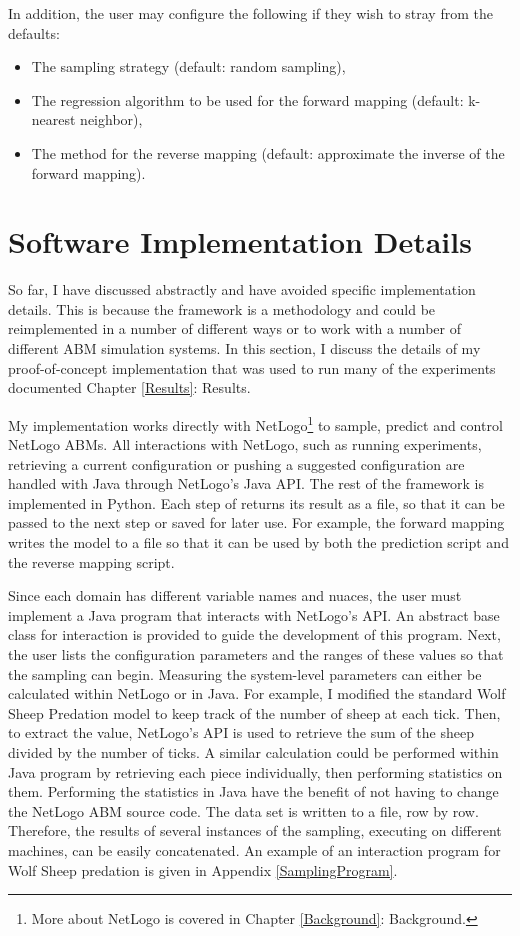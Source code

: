 In addition, the user may configure the following if they wish to stray from the defaults:
\begin{itemize}
   \item The sampling strategy (default: random sampling),
   \item The regression algorithm to be used for the forward mapping (default: k-nearest neighbor),
   \item The method for the reverse mapping (default: approximate the inverse of the forward mapping).
\end{itemize}


\section{Software Implementation Details}
So far, I have discussed \fw abstractly and have avoided specific implementation details.
This is because the framework is a methodology and could be reimplemented in a number of different ways or to work with a number of different ABM simulation systems.
In this section, I discuss the details of my proof-of-concept implementation that was used to run many of the experiments documented Chapter \ref{Results}: Results.

My implementation works directly with NetLogo\footnote{More about NetLogo is covered in Chapter \ref{Background}: Background.} to sample, predict and control NetLogo ABMs.
All interactions with NetLogo, such as running experiments, retrieving a current configuration or pushing a suggested configuration are handled with Java through NetLogo's Java API.
The rest of the framework is implemented in Python.
Each step of \fw returns its result as a file, so that it can be passed to the next step or saved for later use.
For example, the forward mapping writes the model to a file so that it can be used by both the prediction script and the reverse mapping script.

Since each domain has different variable names and nuaces, the user must implement a Java program that interacts with NetLogo's API.
An abstract base class for interaction is provided to guide the development of this program.
Next, the user lists the configuration parameters and the ranges of these values so that the sampling can begin.
Measuring the system-level parameters can either be calculated within NetLogo or in Java.
For example, I modified the standard Wolf Sheep Predation model to keep track of the number of sheep at each tick.
Then, to extract the value, NetLogo's API is used to retrieve the sum of the sheep divided by the number of ticks.
A similar calculation could be performed within Java program by retrieving each piece individually, then performing statistics on them.
Performing the statistics in Java have the benefit of not having to change the NetLogo ABM source code.
The data set is written to a file, row by row.
Therefore, the results of several instances of the sampling, executing on different machines, can be easily concatenated.
An example of an interaction program for Wolf Sheep predation is given in Appendix \ref{SamplingProgram}.



